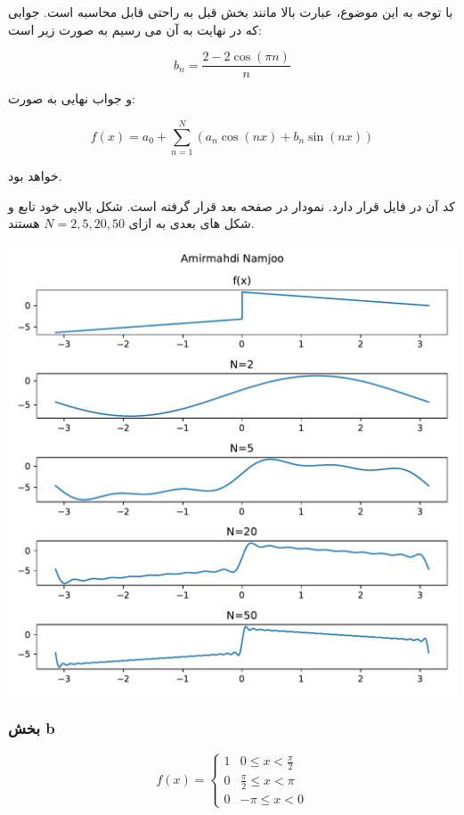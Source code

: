 \documentclass[12pt]{article}
\begin{document}
با توجه به این موضوع، عبارت بالا مانند بخش قبل به راحتی قابل محاسبه است. جوابی که در نهایت به آن می رسیم به صورت زیر است:


$$\boxed{b_n = \frac{2-2 \cos (\pi  n)}{n}}$$


و جواب نهایی به صورت:

$$f(x) = a_0 + \sum_{n=1}^{N} (a_n \cos (n x) + b_n \sin (n x))$$

خواهد بود.

کد آن در فایل 
قرار دارد. نمودار در صفحه بعد قرار گرفته است. شکل بالایی خود تابع و شکل های بعدی به ازای $N=2,5,20,50$ هستند.

\begin{center}
	\includegraphics[width = 1.0 \textwidth]{images/1.pdf}
\end{center}


\newpage

\subsubsection{بخش b}

$$
f(x)=\left\{\begin{array}{lr}
	1 & 0 \leq x<\frac{\pi}{2} \\
	0 & \frac{\pi}{2} \leq x<\pi \\
	0 & -\pi \leq x<0
\end{array}\right.
$$
\end{document}
